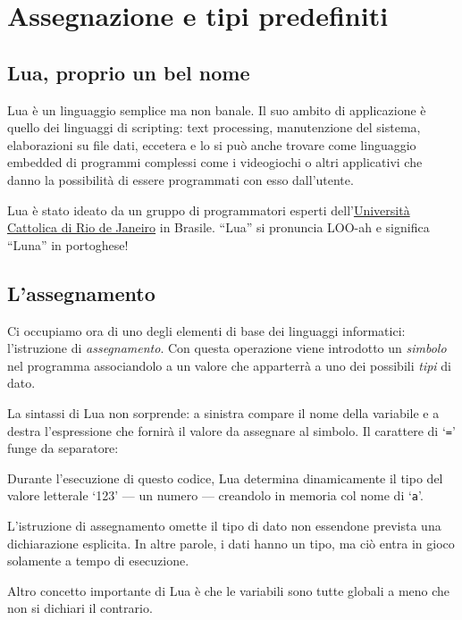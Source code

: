 
\chapter{Assegnazione e tipi predefiniti}
\label{chFondAssignment}


\section{Lua, proprio un bel nome}

Lua è un linguaggio semplice ma non banale. Il suo ambito di applicazione è
quello dei linguaggi di scripting: text processing, manutenzione del sistema,
elaborazioni su file dati, eccetera e lo si può anche trovare come linguaggio
embedded di programmi complessi come i videogiochi o altri applicativi
che danno la possibilità di essere programmati con esso dall'utente.

Lua è stato ideato da un gruppo di programmatori esperti
dell'\href{http://www.puc-rio.br/index.html}{Università Cattolica di Rio de
Janeiro} in Brasile. ``Lua'' si pronuncia LOO-ah e significa ``Luna'' in
portoghese!


\section{L'assegnamento}
\label{secFondAssegnamento}

Ci occupiamo ora di uno degli elementi di base dei linguaggi informatici:
l'istruzione di \emph{assegnamento}. Con questa operazione viene introdotto un
\emph{simbolo} nel programma associandolo a un valore che apparterrà a uno
dei possibili \emph{tipi} di dato.

La sintassi di Lua non sorprende: a sinistra compare il nome della variabile e
a destra l'espressione che fornirà il valore da assegnare al simbolo. Il
carattere di `\texttt{=}' funge da separatore:

Durante l'esecuzione di questo codice, Lua determina dinamicamente il tipo del
valore letterale `123' --- un numero --- creandolo in memoria col nome di
`\texttt{a}'.

L'istruzione di assegnamento omette il tipo di dato non essendone prevista una
dichiarazione esplicita. In altre parole, i dati hanno un tipo, ma ciò entra in
gioco solamente a tempo di esecuzione.

Altro concetto importante di Lua è che le variabili sono tutte globali a meno
che non si dichiari il contrario.


